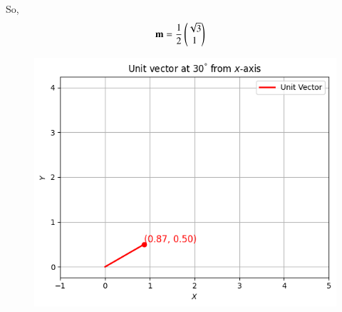 \documentclass[journal]{IEEEtran}
\begin{document}
	So,
	\begin{align}
		\mathbf{m} &= \frac{1}{2} \begin{pmatrix}\sqrt{3} \\ 1\end{pmatrix}
	\end{align}


	\begin{figure}[H]
		\centering
		\includegraphics[width=\textwidth]{plots/plot.png}
	\end{figure}


  
\end{document}
